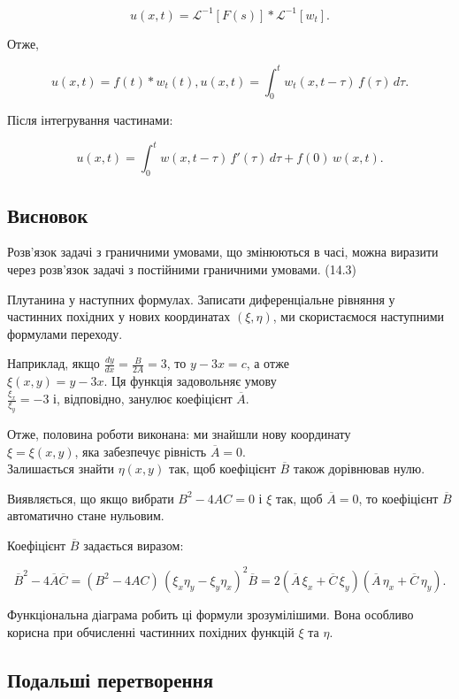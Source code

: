 \documentclass[
  ukrainian,
]{article}
\begin{document}
\[
u(x, t) = \mathcal{L}^{-1}[F(s)] * \mathcal{L}^{-1}[w_t].
\]

Отже,

\[
u(x, t) = f(t) * w_t(t),
u(x, t) = \int_0^t w_t(x, t-\tau)\, f(\tau)\, d\tau.
\]

Після інтегрування частинами:

\[
u(x, t) = \int_{0}^{t} w(x, t-\tau)\, f'(\tau)\, d\tau + f(0)\, w(x, t).
\]

\subsection{Висновок}\label{ux432ux438ux441ux43dux43eux432ux43eux43a}

Розв'язок задачі з граничними умовами, що змінюються в часі, можна
виразити через розв'язок задачі з постійними граничними умовами. (14.3)

Плутанина у наступних формулах. Записати диференціальне рівняння у
частинних похідних у нових координатах \((\xi, \eta)\), ми скористаємося
наступними формулами переходу.

Наприклад, якщо \(\frac{dy}{dx} = \frac{B}{2A} = 3\), то \(y - 3x = c\),
а отже\\
\(\xi(x, y) = y - 3x\). Ця функція задовольняє умову\\
\(\frac{\xi_x}{\xi_y} = -3\) і, відповідно, занулює коефіцієнт
\(\overline{A}\).

Отже, половина роботи виконана: ми знайшли нову координату\\
\(\xi = \xi(x, y)\), яка забезпечує рівність \(\overline{A} = 0\).\\
Залишається знайти \(\eta(x, y)\) так, щоб коефіцієнт \(\overline{B}\)
також дорівнював нулю.

Виявляється, що якщо вибрати \(B^2 - 4AC = 0\) і \(\xi\) так, щоб
\(\overline{A} = 0\), то коефіцієнт \(\overline{B}\) автоматично стане
нульовим.

Коефіцієнт \(\overline{B}\) задається виразом:

\[
\overline{B}^2 - 4\overline{A}\overline{C} = (B^2 - 4AC)\,(\xi_x \eta_y - \xi_y \eta_x)^2
\overline{B} = 2\left( \overline{A}\,\xi_x + \overline{C}\,\xi_y \right)
\left( \overline{A}\,\eta_x + \overline{C}\,\eta_y \right).
\]

Функціональна діаграма робить ці формули зрозумілішими. Вона особливо
корисна при обчисленні частинних похідних функцій \(\xi\) та \(\eta\).

\subsection{Подальші
перетворення}\label{ux43fux43eux434ux430ux43bux44cux448ux456-ux43fux435ux440ux435ux442ux432ux43eux440ux435ux43dux43dux44f}
\end{document}
